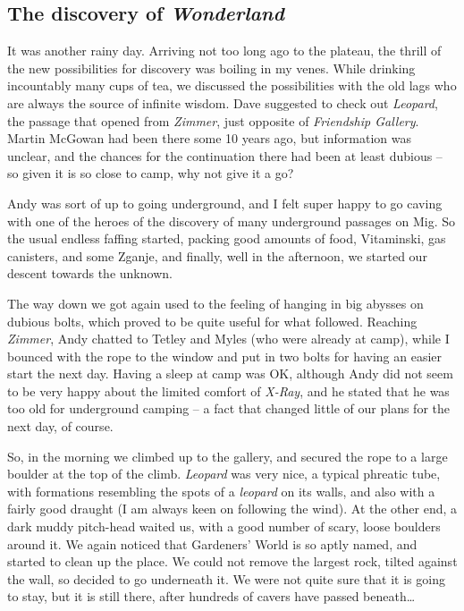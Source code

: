 

\subsection{\texorpdfstring{The discovery of
\emph{Wonderland}}{The discovery of Wonderland}}

It was another rainy day. Arriving not too long ago to the plateau, the
thrill of the new possibilities for discovery was boiling in my venes.
While drinking incountably many cups of tea, we discussed the
possibilities with the old lags who are always the source of infinite
wisdom. Dave suggested to check out \emph{Leopard}, the passage that
opened from \emph{Zimmer}, just opposite of \emph{Friendship Gallery}.
Martin McGowan had been there some 10 years ago, but information was
unclear, and the chances for the continuation there had been at least
dubious -- so given it is so close to camp, why not give it a go?

Andy was sort of up to going underground, and I felt super happy to go
caving with one of the heroes of the discovery of many underground
passages on Mig. So the usual endless faffing started, packing good
amounts of food, Vitaminski, gas canisters, and some Zganje, and
finally, well in the afternoon, we started our descent towards the
unknown.

The way down we got again used to the feeling of hanging in big abysses
on dubious bolts, which proved to be quite useful for what followed.
Reaching \emph{Zimmer}, Andy chatted to Tetley and Myles (who were
already at camp), while I bounced with the rope to the window and put in
two bolts for having an easier start the next day. Having a sleep at
camp was OK, although Andy did not seem to be very happy about the
limited comfort of \emph{X-Ray}, and he stated that he was too old for
underground camping -- a fact that changed little of our plans for the
next day, of course.

So, in the morning we climbed up to the gallery, and secured the rope to
a large boulder at the top of the climb. \emph{Leopard} was very nice, a
typical phreatic tube, with formations resembling the spots of a
\emph{leopard} on its walls, and also with a fairly good draught (I am
always keen on following the wind). At the other end, a dark muddy
pitch-head waited us, with a good number of scary, loose boulders around
it. We again noticed that Gardeners' World is so aptly named, and
started to clean up the place. We could not remove the largest rock,
tilted against the wall, so decided to go underneath it. We were not
quite sure that it is going to stay, but it is still there, after
hundreds of cavers have passed beneath\ldots{}

